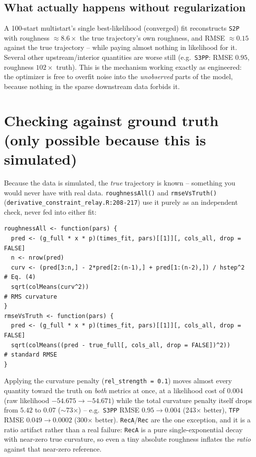 \documentclass[11pt]{article}
\newcommand{\code}[1]{\texttt{#1}}
\newcommand{\file}[1]{\textcolor{black!60}{\texttt{#1}}}
\begin{document}
\subsection{What actually happens without regularization}
A 100-start multistart's single best-likelihood (converged) fit reconstructs
\code{S2P} with roughness $\approx 8.6\times$ the true trajectory's own
roughness, and RMSE $\approx 0.15$ against the true trajectory -- while
paying almost nothing in likelihood for it. Several other upstream/interior
quantities are worse still (e.g.\ \code{S3PP}: RMSE $0.95$, roughness
$102\times$ truth). This is the mechanism working exactly as engineered:
the optimizer is free to overfit noise into the \emph{unobserved} parts of
the model, because nothing in the sparse downstream data forbids it.

\section{Checking against ground truth (only possible because this is simulated)}

Because the data is simulated, the \emph{true} trajectory is known --
something you would never have with real data. \code{roughnessAll()} and
\code{rmseVsTruth()} (\file{derivative\_constraint\_relay.R:208-217}) use it
purely as an independent check, never fed into either fit:
\begin{lstlisting}
roughnessAll <- function(pars) {
  pred <- (g_full * x * p)(times_fit, pars)[[1]][, cols_all, drop = FALSE]
  n <- nrow(pred)
  curv <- (pred[3:n,] - 2*pred[2:(n-1),] + pred[1:(n-2),]) / hstep^2   # Eq. (4)
  sqrt(colMeans(curv^2))                                               # RMS curvature
}
rmseVsTruth <- function(pars) {
  pred <- (g_full * x * p)(times_fit, pars)[[1]][, cols_all, drop = FALSE]
  sqrt(colMeans((pred - true_full[, cols_all, drop = FALSE])^2))        # standard RMSE
}
\end{lstlisting}
Applying the curvature penalty (\code{rel\_strength = 0.1}) moves almost
every quantity toward the truth on \emph{both} metrics at once, at a
likelihood cost of $0.004$ (raw likelihood $-54.675 \to -54.671$) while the
total curvature penalty itself drops from $5.42$ to $0.07$ ($\sim$73$\times$)
-- e.g.\ \code{S3PP} RMSE $0.95 \to 0.004$ (243$\times$ better), \code{TFP}
RMSE $0.049\to0.0002$ (300$\times$ better). \code{RecA}/\code{Rec} are the
one exception, and it is a ratio artifact rather than a real failure:
\code{RecA} is a pure single-exponential decay with near-zero true
curvature, so even a tiny absolute roughness inflates the \emph{ratio}
against that near-zero reference.
\end{document}

